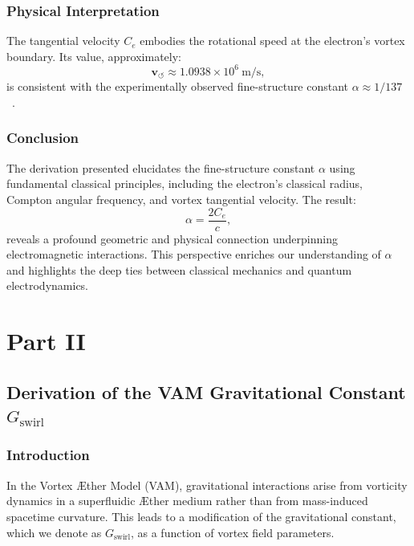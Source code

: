 \documentclass[a4paper,10pt]{article}
\begin{document}
\subsubsection*{Physical Interpretation}
The tangential velocity $C_e$ embodies the rotational speed at the electron's vortex boundary. Its value, approximately:
\begin{equation*}
    \mathbf{v}_{\scriptscriptstyle\boldsymbol{\circlearrowleft}} \approx 1.0938 \times 10^6 \ \text{m/s},
\end{equation*}
is consistent with the experimentally observed fine-structure constant $\alpha \approx 1/137$~\cite{ricca1998}.

\subsubsection*{Conclusion}
The derivation presented elucidates the fine-structure constant $\alpha$ using fundamental classical principles, including the electron's classical radius, Compton angular frequency, and vortex tangential velocity. The result:
\begin{equation*}
    \alpha = \frac{2 C_e}{c},
\end{equation*}
reveals a profound geometric and physical connection underpinning electromagnetic interactions.
This perspective enriches our understanding of $\alpha$ and highlights the deep ties between classical mechanics and quantum electrodynamics.

    


    \newpage \section*{Part II}\label{sec:part-2} 
\subsection{Derivation of the VAM Gravitational Constant \(  G_\text{swirl} \)}

\subsubsection*{Introduction}
In the Vortex Æther Model (VAM), gravitational interactions arise from vorticity dynamics in a superfluidic Æther medium rather than from mass-induced spacetime curvature. This leads to a modification of the gravitational constant, which we denote as \(  G_\text{swirl} \), as a function of vortex field parameters.
\end{document}
